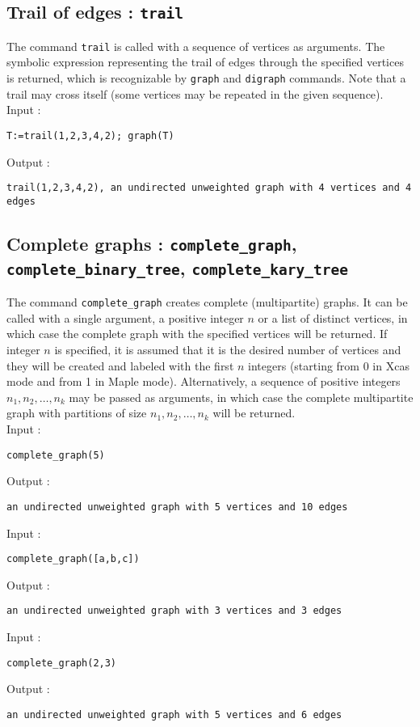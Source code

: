 \documentclass[a4paper,11pt]{article}
\begin{document}
\subsection{Trail of edges : {\tt trail}}

The command {\tt trail} is called with a sequence of vertices as arguments. The symbolic expression representing the trail of edges through the specified vertices is returned, which is recognizable by {\tt graph} and {\tt digraph} commands. Note that a trail may cross itself (some vertices may be repeated in the given sequence).\\
Input :
\begin{center}
  \tt T:=trail(1,2,3,4,2); graph(T)
\end{center}
Output :
\begin{center}
  \tt trail(1,2,3,4,2), an undirected unweighted graph with 4 vertices and 4 edges 
\end{center}

\subsection{Complete graphs : {\tt complete\_graph}, {\tt complete\_binary\_tree}, {\tt complete\_kary\_tree}}

The command {\tt complete\_graph} creates complete (multipartite) graphs. It can be called with a single argument, a positive integer $ n $ or a list of distinct vertices, in which case the complete graph with the specified vertices will be returned. If integer $ n $ is specified, it is assumed that it is the desired number of vertices and they will be created and labeled with the first $ n $ integers (starting from 0 in Xcas mode and from 1 in Maple mode). Alternatively, a sequence of positive integers $ n_1,n_2,\dots,n_k $ may be passed as arguments, in which case the complete multipartite graph with partitions of size $ n_1,n_2,\dots,n_k $ will be returned.\\
Input :
\begin{center}
  \tt complete\_graph(5)
\end{center}
Output :
\begin{center}
  \tt an undirected unweighted graph with 5 vertices and 10 edges
\end{center}
Input :
\begin{center}
  \tt complete\_graph([a,b,c])
\end{center}
Output :
\begin{center}
  \tt an undirected unweighted graph with 3 vertices and 3 edges
\end{center}
Input :
\begin{center}
  \tt complete\_graph(2,3)
\end{center}
Output :
\begin{center}
  \tt an undirected unweighted graph with 5 vertices and 6 edges
\end{center}
\end{document}
